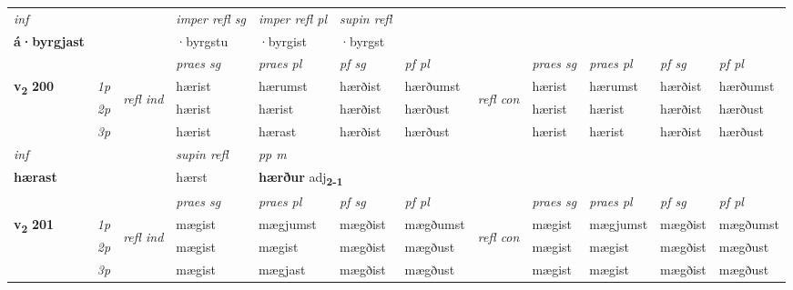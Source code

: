 \begin{longtable}[l]{X>{\footnotesize\itshape}llXXXXlXXXX}
   {\textit{inf}} & &   & \textit{imper refl sg} & \textit{imper refl pl}   & \textit{supin refl}  \\*
  {\textbf{á\allowbreak ·byrgjast}} & &   & ·byrgstu & ·byrgist   & ·byrgst  \\*

\midrule

 & &   & \textit{praes sg}  & \textit{praes pl}    & \textit{ pf sg} & \textit{pf pl} & & \textit{praes sg}  & \textit{praes pl}    & \textit{pf sg} & \textit{pf pl }  \\ \cmidrule{4-7} \cmidrule{9-12}
 \multirow{2}{*}{{{\textbf{v{\textsubscript{2}}} \Large{\textbf{200}}}}}  & 1p & \multirow{3}{*}{\begin{turn}{90}\textit{refl ind}\end{turn}}  & hærist & hærumst & hærðist & hærðumst & \multirow{3}{*}{\begin{turn}{90}\textit{refl con}\end{turn}}  &hærist & hærumst & hærðist & hærðumst \\*
 & 2p &  & hærist & hærist & hærðist & hærðust & &hærist & hærist & hærðist & hærðust \\*
 & 3p  & & hærist & hærast & hærðist & hærðust & & hærist & hærist& hærðist & hærðust \\*
\cmidrule{4-7} \cmidrule{9-12}

   {\textit{inf}} & &       & \textit{supin refl} & \textit{pp m} \\*
  {\textbf{hærast}} & &       & hærst & \multicolumn{2}{l}{\textbf{hærður} adj\textbf{\textsubscript{2-1}}} \\*

\midrule

 & &   & \textit{praes sg}  & \textit{praes pl}    & \textit{ pf sg} & \textit{pf pl} & & \textit{praes sg}  & \textit{praes pl}    & \textit{pf sg} & \textit{pf pl }  \\ \cmidrule{4-7} \cmidrule{9-12}
 \multirow{2}{*}{{{\textbf{v{\textsubscript{2}}} \Large{\textbf{201}}}}}  & 1p & \multirow{3}{*}{\begin{turn}{90}\textit{refl ind}\end{turn}}  & mægist & mægjumst & mægðist & mægðumst & \multirow{3}{*}{\begin{turn}{90}\textit{refl con}\end{turn}}  &mægist & mægjumst & mægðist & mægðumst \\*
 & 2p &  & mægist & mægist & mægðist & mægðust & &mægist & mægist & mægðist & mægðust \\*
 & 3p  & & mægist & mægjast & mægðist & mægðust & & mægist & mægist& mægðist & mægðust \\*
\cmidrule{4-7} \cmidrule{9-12}


\end{longtable}
